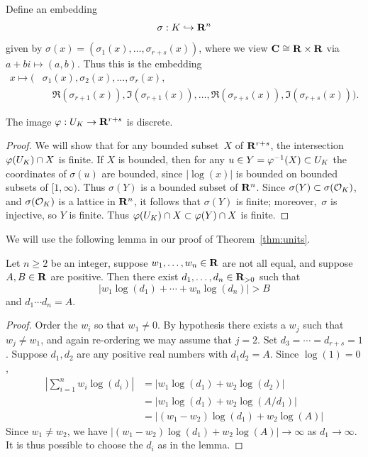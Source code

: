 Define an embedding
\begin{equation}\label{eqn:sigma3}
 \sigma : K\hookrightarrow \mathbf{R}^n
\end{equation}
given by $\sigma(x) = (\sigma_1(x),\ldots,\sigma_{r+s}(x))$,
where we view $\mathbf{C}\cong \mathbf{R}\times \mathbf{R}$ via $a+b i\mapsto (a,b)$.
Thus this is the embedding
\begin{align*}
 x\mapsto \big(&\sigma_1(x), \sigma_2(x),\ldots, \sigma_r(x),\\
     &\quad \Re(\sigma_{r+1}(x)), \Im(\sigma_{r+1}(x)), 
    \ldots, \Re(\sigma_{r+s}(x)), \Im(\sigma_{r+s}(x))\big).
\end{align*}

\begin{lemma}\label{lem:ukdiscrete}
The image $\varphi:U_K\to \mathbf{R}^{r+s}$ is discrete.
\end{lemma}
\begin{proof}
We will show that for any bounded subset~$X$ 
of $\mathbf{R}^{r+s}$, the intersection $\varphi(U_K)\cap X$ is finite.
If $X$ is bounded, then for any $u\in
Y=\varphi^{-1}(X)\subset U_K$ the coordinates of $\sigma(u)$ are bounded, 
since $|\log(x)|$ is bounded on bounded subsets
of $[1,\infty)$.
Thus $\sigma(Y)$ is
a bounded subset of $\mathbf{R}^n$.  Since $\sigma(Y)\subset \sigma(\mathcal{O}_K)$,
and $\sigma(\mathcal{O}_K)$ is a lattice in $\mathbf{R}^n$, it follows that $\sigma(Y)$
is finite; moreover,~$\sigma$ is injective, so $Y$ is finite.
Thus $\varphi(U_K)\cap X \subset \varphi(Y) \cap X$ is finite.
\end{proof}

We will use the following lemma in our
proof of Theorem~\ref{thm:units}.
\begin{lemma}\label{lem:chooseci}
Let $n\geq 2$ be an integer, suppose $w_1,\ldots, w_n\in\mathbf{R}$
are not all equal, and suppose $A, B\in\mathbf{R}$ are positive. Then
there exist $d_1,\ldots, d_{n} \in \mathbf{R}_{>0}$ such that 
$$|w_1\log(d_1)+\cdots +w_{n}\log(d_{n})| > B$$  
and $d_1\cdots d_n = A$.
\end{lemma}
\begin{proof}
Order the $w_i$ so
that $w_1\neq 0$.  By hypothesis there exists a $w_j$ such that
$w_j\neq w_1$, and again re-ordering we may assume that $j=2$.  Set
$d_3=\cdots=d_{r+s}=1$.  Suppose $d_1, d_2$ are any positive real numbers
with  $d_1 d_2 = A$.  Since $\log(1)=0$,
\begin{align*}
  \left|\sum_{i=1}^{n} w_i \log(d_i)\right|
  &= |w_1\log(d_1) + w_2\log(d_2)|\\
  &= |w_1 \log(d_1) + w_2\log(A/d_1)| \\
  &= |(w_1-w_2)\log(d_1) + w_2\log(A)|
\end{align*}
Since $w_1\neq w_2$,  we have $|(w_1-w_2)\log(d_1) + w_2\log(A)|\to\infty$
as $d_1\to \infty$.  It is thus possible to choose the $d_i$ as in the lemma.
\end{proof}

